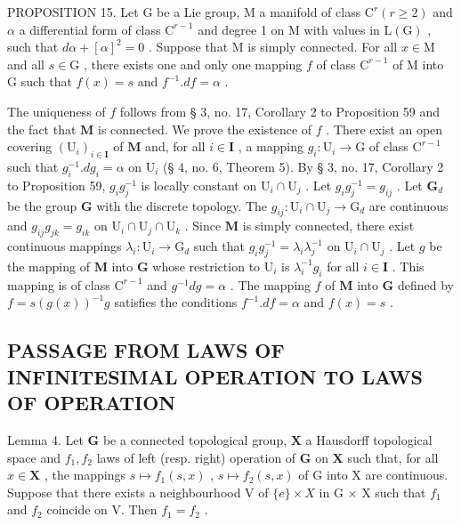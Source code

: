 PROPOSITION 15. Let \(\mathrm{G}\) be a Lie group, \(\mathrm{M}\) a manifold of class \(\mathrm{C}^r (r\geqslant 2)\) and \(\alpha\) a differential form of class \(\mathrm{C}^{r - 1}\) and degree 1 on \(\mathrm{M}\) with values in \(\mathrm{L}(\mathrm{G})\) , such that \(d\alpha +[\alpha ]^2 = 0\) . Suppose that \(\mathrm{M}\) is simply connected. For all \(x\in \mathrm{M}\) and all \(s\in \mathrm{G}\) , there exists one and only one mapping \(f\) of class \(\mathrm{C}^{r - 1}\) of \(\mathrm{M}\) into \(\mathrm{G}\) such that \(f(x) = s\) and \(f^{-1}.df = \alpha\) .

The uniqueness of \(f\) follows from § 3, no. 17, Corollary 2 to Proposition 59 and the fact that \(\mathbf{M}\) is connected. We prove the existence of \(f\) . There exist an open covering \((\mathrm{U}_i)_{i\in \mathbf{I}}\) of \(\mathbf{M}\) and, for all \(i\in \mathbf{I}\) , a mapping \(g_i: \mathrm{U}_i\to \mathrm{G}\) of class \(\mathrm{C}^{r - 1}\) such that \(g_i^{-1}.d g_i = \alpha\) on \(\mathrm{U}_i\) (§ 4, no. 6, Theorem 5). By § 3, no. 17, Corollary 2 to Proposition 59, \(g_i g_j^{-1}\) is locally constant on \(\mathrm{U}_i\cap \mathrm{U}_j\) . Let \(g_i g_j^{-1} = g_{ij}\) . Let \(\mathbf{G}_d\) be the group \(\mathbf{G}\) with the discrete topology. The \(g_{ij}: \mathrm{U}_i\cap \mathrm{U}_j\to \mathrm{G}_d\) are continuous and \(g_{ij}g_{jk} = g_{ik}\) on \(\mathrm{U}_i\cap \mathrm{U}_j\cap \mathrm{U}_k\) . Since \(\mathbf{M}\) is simply connected, there exist continuous mappings \(\lambda_i: \mathrm{U}_i\to \mathrm{G}_d\) such that \(g_i g_j^{-1} = \lambda_i\lambda_j^{-1}\) on \(\mathrm{U}_i\cap \mathrm{U}_j\) . Let \(g\) be the mapping of \(\mathbf{M}\) into \(\mathbf{G}\) whose restriction to \(\mathrm{U}_i\) is \(\lambda_i^{-1}g_i\) for all \(i\in \mathbf{I}\) . This mapping is of class \(\mathrm{C}^{r - 1}\) and \(g^{-1}d g = \alpha\) . The mapping \(f\) of \(\mathbf{M}\) into \(\mathbf{G}\) defined by \(f = s(g(x))^{-1}g\) satisfies the conditions \(f^{-1}.df = \alpha\) and \(f(x) = s\) .

\subsection{PASSAGE FROM LAWS OF INFINITESIMAL OPERATION TO LAWS OF OPERATION}

Lemma 4. Let \(\mathbf{G}\) be a connected topological group, \(\mathbf{X}\) a Hausdorff topological space and \(f_{1}, f_{2}\) laws of left (resp. right) operation of \(\mathbf{G}\) on \(\mathbf{X}\) such that, for all \(x \in \mathbf{X}\) , the mappings \(s \mapsto f_1(s, x)\) , \(s \mapsto f_2(s, x)\) of G into X are continuous. Suppose that there exists a neighbourhood V of \(\{e\} \times X\) in G \(\times\) X such that \(f_1\) and \(f_2\) coincide on V. Then \(f_1 = f_2\) .

